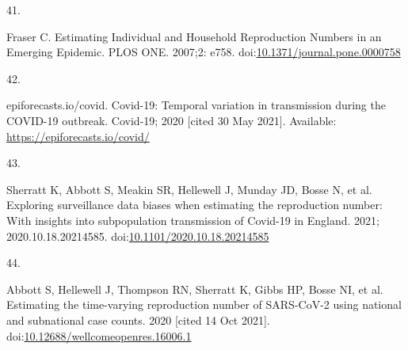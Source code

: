 \documentclass[10pt,letterpaper]{article} %
\newlength{\cslhangindent}
\newlength{\csllabelwidth}
\newlength{\cslentryspacingunit} %
\newenvironment{CSLReferences}[2] %
 {%
  \setlength{\parindent}{0pt}
  \ifodd #1
  \let\oldpar\par
  \def\par{\hangindent=\cslhangindent\oldpar}
  \fi
  \setlength{\parskip}{#2\cslentryspacingunit}
 }%
 {}
\newcommand{\CSLLeftMargin}[1]{\parbox[t]{\csllabelwidth}{#1}}
\newcommand{\CSLRightInline}[1]{\parbox[t]{\linewidth - \csllabelwidth}{#1}\break}
\providecommand{\DIFaddbegin}{} %
\providecommand{\DIFaddend}{} %
\providecommand{\DIFdelbegin}{} %
\providecommand{\DIFdelend}{} %
\newcommand{\DIFscaledelfig}{0.5}
\newlength{\DIFdelgraphicswidth} %
\newlength{\DIFdelgraphicsheight} %
\newcommand{\DIFaddincludegraphics}[2][]{{\color{blue}\fbox{\DIFOincludegraphics[#1]{#2}}}} %
\newcommand{\DIFdelincludegraphics}[2][]{%
\sbox{\DIFdelgraphicsbox}{\DIFOincludegraphics[#1]{#2}}%
\settoboxwidth{\DIFdelgraphicswidth}{\DIFdelgraphicsbox} %
\settoboxtotalheight{\DIFdelgraphicsheight}{\DIFdelgraphicsbox} %
\scalebox{\DIFscaledelfig}{%
\parbox[b]{\DIFdelgraphicswidth}{\usebox{\DIFdelgraphicsbox}\\[-\baselineskip] \rule{\DIFdelgraphicswidth}{0em}}\llap{\resizebox{\DIFdelgraphicswidth}{\DIFdelgraphicsheight}{%
\setlength{\unitlength}{\DIFdelgraphicswidth}%
\begin{picture}(1,1)%
\thicklines\linethickness{2pt} %
{\color[rgb]{1,0,0}\put(0,0){\framebox(1,1){}}}%
{\color[rgb]{1,0,0}\put(0,0){\line( 1,1){1}}}%
{\color[rgb]{1,0,0}\put(0,1){\line(1,-1){1}}}%
\end{picture}%
}\hspace*{3pt}}} %
} %
\DeclareRobustCommand{\DIFaddbegin}{\DIFOaddbegin \let\includegraphics\DIFaddincludegraphics} %
\DeclareRobustCommand{\DIFaddend}{\DIFOaddend \let\includegraphics\DIFOincludegraphics} %
\DeclareRobustCommand{\DIFdelbegin}{\DIFOdelbegin \let\includegraphics\DIFdelincludegraphics} %
\DeclareRobustCommand{\DIFdelend}{\DIFOaddend \let\includegraphics\DIFOincludegraphics} %
\begin{document}
\begin{CSLReferences}{0}{0}
\leavevmode{}%
\CSLLeftMargin{41. }
\DIFdelbegin %
\DIFdelend \DIFaddbegin \CSLRightInline{Fraser C. Estimating {Individual} and {Household
Reproduction Numbers} in an {Emerging Epidemic}. PLOS ONE. 2007;2: e758.
doi:\href{https://doi.org/10.1371/journal.pone.0000758}{10.1371/journal.pone.0000758}}
\DIFaddend 

\leavevmode{}%
\CSLLeftMargin{42. }
\DIFdelbegin %
\DIFdelend \DIFaddbegin \CSLRightInline{epiforecasts.io/covid. Covid-19: {Temporal} variation in
transmission during the {COVID-19} outbreak. {Covid-19}; 2020 {[}cited
30 May 2021{]}. Available: \url{https://epiforecasts.io/covid/}}
\DIFaddend 

\leavevmode{}%
\CSLLeftMargin{43. }
\DIFdelbegin %
\DIFdelend \DIFaddbegin \CSLRightInline{Sherratt K, Abbott S, Meakin SR, Hellewell J, Munday JD,
Bosse N, et al. Exploring surveillance data biases when estimating the
reproduction number: With insights into subpopulation transmission of
{Covid-19} in {England}. 2021; 2020.10.18.20214585.
doi:\href{https://doi.org/10.1101/2020.10.18.20214585}{10.1101/2020.10.18.20214585}}
\DIFaddend 

\leavevmode{}%
\CSLLeftMargin{44. }
\DIFdelbegin %
\DIFdelend \DIFaddbegin \CSLRightInline{Abbott S, Hellewell J, Thompson RN, Sherratt K, Gibbs
HP, Bosse NI, et al. Estimating the time-varying reproduction number of
{SARS-CoV-2} using national and subnational case counts. 2020 {[}cited
14 Oct 2021{]}.
doi:\href{https://doi.org/10.12688/wellcomeopenres.16006.1}{10.12688/wellcomeopenres.16006.1}}
\DIFaddend 


\end{CSLReferences}
\end{document}
